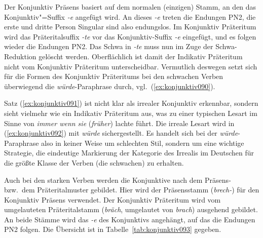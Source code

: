 
Der Konjunktiv Präsens basiert auf dem normalen (einzigen) Stamm, an den das Konjunktiv"=Suffix \textit{-e} angefügt wird.
An dieses \textit{-e} treten die Endungen PN2, die erste und dritte Person Singular sind also endungslos.
Im Konjunktiv Präteritum wird das Präteritalsuffix \textit{-te} vor das Konjunktiv-Suffix \textit{-e} eingefügt, und es folgen wieder die Endungen PN2.
Das Schwa in \textit{-te} muss nun im Zuge der Schwa-Reduktion gelöscht werden.
Oberflächlich ist damit der Indikativ Präteritum nicht vom Konjunktiv Präteritum unterscheidbar.
Vermutlich deswegen setzt sich für die Formen des Konjunktiv Präteritums bei den schwachen Verben überwiegend die \textit{würde}-Paraphrase durch, vgl.\ (\ref{ex:konjunktiv090}).

\begin{exe}
  \ex\label{ex:konjunktiv090}
  \begin{xlist}
  \end{xlist}
\end{exe}

Satz (\ref{ex:konjunktiv091}) ist nicht klar als irrealer Konjunktiv erkennbar, sondern sieht vielmehr wie ein Indikativ Präteritum aus, was zu einer typischen Lesart im Sinne von \textit{immer wenn sie }(\textit{früher}) {lachte} führt.
Die irreale Lesart wird in (\ref{ex:konjunktiv092}) mit \textit{würde} sichergestellt.
Es handelt sich bei der \textit{würde}-Paraphrase also in keiner Weise um schlechten Stil, sondern um eine wichtige Strategie, die eindeutige Markierung der Kategorie des Irrealis im Deutschen für die größte Klasse der Verben (die schwachen) zu erhalten.

Auch bei den starken Verben werden die Konjunktive nach dem Präsens- bzw.\ dem Präteritalmuster gebildet.
Hier wird der Präsensstamm (\textit{brech-}) für den Konjunktiv Präsens verwendet.
Der Konjunktiv Präteritum wird vom umgelauteten Präteritalstamm (\textit{bräch}, umgelautet von \textit{brach}) ausgehend gebildet.
An beide Stämme wird das \textit{-e} des Konjunktivs angehängt, auf das die Endungen PN2 folgen.
Die Übersicht ist in Tabelle~\ref{tab:konjunktiv093} gegeben.

